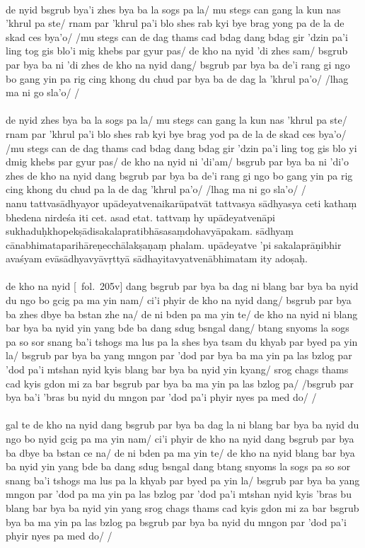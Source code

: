 \documentclass[12pt]{article}
\begin{document}
\textbf{\TVA}\\
de nyid bsgrub bya'i zhes bya ba la sogs pa la/ mu stegs can gang la kun nas 'khrul pa ste/ rnam par 'khrul pa'i blo shes rab kyi bye brag yong pa de la de skad ces bya'o/ /mu stegs can de dag thams cad bdag dang bdag gir 'dzin pa'i ling tog gis blo'i mig khebs par gyur pas/ de kho na nyid 'di zhes sam/ bsgrub par bya ba ni 'di zhes de kho na nyid dang/ bsgrub par bya ba de'i rang gi ngo bo gang yin pa rig cing khong du chud par bya ba de dag la 'khrul pa'o/ /lhag ma ni go sla'o/ /\\

\textbf{\TVB}\\
de nyid zhes bya ba la sogs pa la/ mu stegs can gang la kun nas 'khrul pa ste/ rnam par 'khrul pa'i blo shes rab kyi bye brag yod pa de la de skad ces bya'o/ /mu stegs can de dag thams cad bdag dang bdag gir 'dzin pa'i ling tog gis blo yi dmig khebs par gyur pas/ de kho na nyid ni 'di'am/ bsgrub par bya ba ni 'di'o zhes de kho na nyid dang bsgrub par bya ba de'i rang gi ngo bo gang yin pa rig cing khong du chud pa la de dag 'khrul pa'o/ /lhag ma ni go sla'o/ /\\

nanu tattvasādhyayor upādeyatvenaikarūpatvāt tattvasya sādhyasya ceti kathaṃ\footnoteB{
	tattvasya sādhyasya ceti kathaṃ] \EDD\ (\emd); tat kathaṃ tatvasya sādhyasya ceti \MS
} bhedena nirdeśa iti cet.
asad etat.
tattvaṃ hy upādeyatvenāpi sukhaduḥkhopekṣādisakalapratibhāsasaṃdohavyāpakam.
sādhyaṃ cānabhimataparihāreṇecchālakṣaṇaṃ phalam.
upādeyatve 'pi sakalaprāṇibhir avaśyam evāsādhyavyāvṛttyā sādhayitavyatvenābhimatam ity adoṣaḥ.\\

\textbf{\TVA}\\
de kho na nyid [\TVA\ fol.\ 205v] dang bsgrub par bya ba dag ni blang bar bya ba nyid du ngo bo gcig pa ma yin nam/ ci'i phyir de kho na nyid dang/ bsgrub par bya ba zhes dbye ba bstan zhe na/ de ni bden pa ma yin te/ de kho na nyid ni blang bar bya ba nyid yin yang bde ba dang sdug bsngal dang/ btang snyoms la sogs pa so sor snang ba'i tshogs ma lus pa la shes bya tsam du khyab par byed pa yin la/ bsgrub par bya ba yang mngon par 'dod par bya ba ma yin pa las bzlog par 'dod pa'i mtshan nyid kyis blang bar bya ba nyid yin kyang/ srog chags thams cad kyis gdon mi za bar bsgrub par bya ba ma yin pa las bzlog pa/ /bsgrub par bya ba'i 'bras bu nyid du mngon par 'dod pa'i phyir nyes pa med do/ /\\

\textbf{\TVB}\\
gal te de kho na nyid dang bsgrub par bya ba dag la ni blang bar bya ba nyid du ngo bo nyid gcig pa ma yin nam/ ci'i phyir de kho na nyid dang bsgrub par bya ba dbye ba bstan ce na/ de ni bden pa ma yin te/ de kho na nyid blang bar bya ba nyid yin yang bde ba dang sdug bsngal dang btang snyoms la sogs pa so sor snang ba'i tshogs ma lus pa la khyab par byed pa yin la/ bsgrub par bya ba yang mngon par 'dod pa ma yin pa las bzlog par 'dod pa'i mtshan nyid kyis 'bras bu blang bar bya ba nyid yin yang srog chags thams cad kyis gdon mi za bar bsgrub bya ba ma yin pa las bzlog pa bsgrub par bya ba nyid du mngon par 'dod pa'i phyir nyes pa med do/ /
\end{document}
